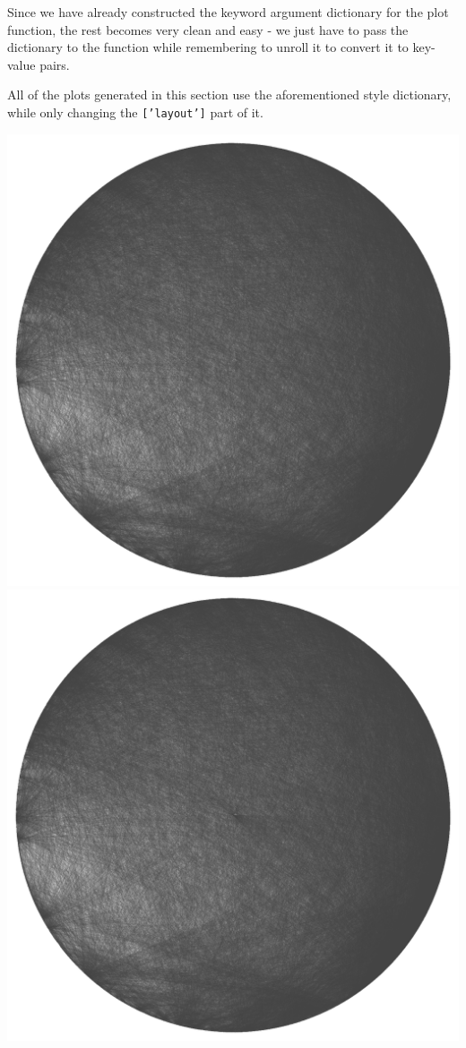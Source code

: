 \documentclass[12pt, a4paper]{article}
\begin{document}
Since we have already constructed the keyword argument dictionary for the plot function, the rest becomes very clean and easy - we just have to pass the dictionary to the function while remembering to unroll it to convert it to key-value pairs.


All of the plots generated in this section use the aforementioned style dictionary, while only changing the \texttt{['layout']} part of it.

\begin{multicols}{2}
{\centering
\includegraphics[width=\columnwidth]{src/youtube/hdg/comp/1_plot_crc}\\
\label{fig:hdg_c1}}
{\centering
\includegraphics[width=\columnwidth]{src/youtube/hdg/comp/2_plot_str}\\
}
\end{multicols}
\end{document}

